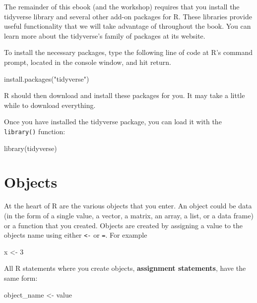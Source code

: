 \documentclass[
]{book}
\newenvironment{Shaded}{\begin{snugshade}}{\end{snugshade}}
\newcommand{\DecValTok}[1]{\textcolor[rgb]{0.00,0.00,0.81}{#1}}
\newcommand{\FunctionTok}[1]{\textcolor[rgb]{0.00,0.00,0.00}{#1}}
\newcommand{\NormalTok}[1]{#1}
\newcommand{\OtherTok}[1]{\textcolor[rgb]{0.56,0.35,0.01}{#1}}
\newcommand{\StringTok}[1]{\textcolor[rgb]{0.31,0.60,0.02}{#1}}
\begin{document}
The remainder of this ebook (and the workshop) requires that you install the tidyverse library and several other add-on packages for R. These libraries provide useful functionality that we will take advantage of throughout the book. You can learn more about the tidyverse's family of packages at its website.

To install the necessary packages, type the following line of code at R's command prompt, located in the console window, and hit return.

\begin{Shaded}
\begin{Highlighting}[]
\FunctionTok{install.packages}\NormalTok{(}\StringTok{"tidyverse"}\NormalTok{)}
\end{Highlighting}
\end{Shaded}

R should then download and install these packages for you. It may take a little while to download everything.

Once you have installed the tidyverse package, you can load it with the \texttt{library()} function:

\begin{Shaded}
\begin{Highlighting}[]
\FunctionTok{library}\NormalTok{(tidyverse)}
\end{Highlighting}
\end{Shaded}

\hypertarget{objects}{%
\section{Objects}\label{objects}}

At the heart of R are the various objects that you enter. An object could be data (in the form of a single value, a vector, a matrix, an array, a list, or a data frame) or a function that you created. Objects are created by assigning a value to the objects name using either \texttt{\textless{}-} or \texttt{=}. For example

\begin{Shaded}
\begin{Highlighting}[]
\NormalTok{x }\OtherTok{\textless{}{-}} \DecValTok{3}
\end{Highlighting}
\end{Shaded}

All R statements where you create objects, \textbf{assignment statements}, have the same form:

\begin{Shaded}
\begin{Highlighting}[]
\NormalTok{object\_name }\OtherTok{\textless{}{-}}\NormalTok{ value}
\end{Highlighting}
\end{Shaded}
\end{document}
